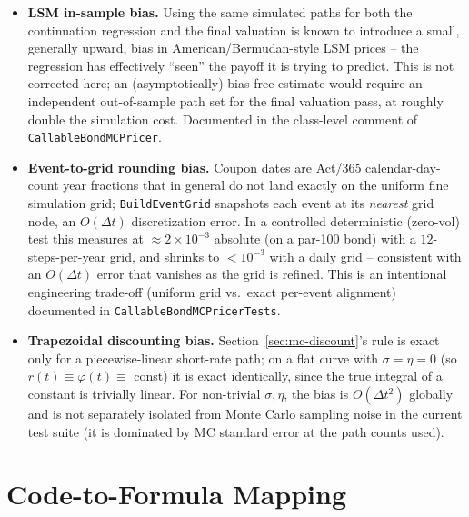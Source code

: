 \documentclass[11pt,a4paper]{article}
\newcommand{\coderef}[1]{\texttt{\color{blue!60!black}#1}}
\theoremstyle{definition}
\begin{document}
\begin{itemize}[nosep]
  \item \textbf{LSM in-sample bias.} Using the same simulated paths for both
        the continuation regression and the final valuation is known to
        introduce a small, generally upward, bias in American/Bermudan-style
        LSM prices -- the regression has effectively ``seen'' the payoff
        it is trying to predict. This is not corrected here; an
        (asymptotically) bias-free estimate would require an independent
        out-of-sample path set for the final valuation pass, at roughly
        double the simulation cost. Documented in the class-level comment of
        \coderef{CallableBondMCPricer}.
  \item \textbf{Event-to-grid rounding bias.} \label{sec:discretization-bias}
        Coupon dates are Act/365 calendar-day-count year fractions that in
        general do not land exactly on the uniform fine simulation grid;
        \coderef{BuildEventGrid} snapshots each event at its \emph{nearest}
        grid node, an $O(\Delta t)$ discretization error. In a controlled
        deterministic (zero-vol) test this measures at $\approx 2\times10^{-3}$
        absolute (on a par-100 bond) with a $12$-steps-per-year grid, and
        shrinks to $<10^{-3}$ with a daily grid -- consistent with an
        $O(\Delta t)$ error that vanishes as the grid is refined. This is an
        intentional engineering trade-off (uniform grid vs.\ exact per-event
        alignment) documented in \coderef{CallableBondMCPricerTests}.
  \item \textbf{Trapezoidal discounting bias.} Section~\ref{sec:mc-discount}'s
        rule is exact only for a piecewise-linear short-rate path; on a flat
        curve with $\sigma=\eta=0$ (so $r(t)\equiv\varphi(t)\equiv$ const) it
        is exact identically, since the true integral of a constant is
        trivially linear. For non-trivial $\sigma,\eta$, the bias is
        $O(\Delta t^2)$ globally and is not separately isolated from Monte
        Carlo sampling noise in the current test suite (it is dominated by
        MC standard error at the path counts used).
\end{itemize}

\section{Code-to-Formula Mapping}
\label{sec:mapping}
\end{document}
